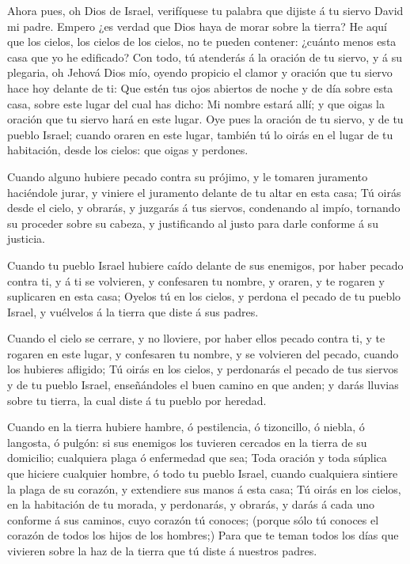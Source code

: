  Ahora pues, oh Dios de Israel, verifíquese tu palabra que
dijiste á tu siervo David mi padre.  Empero ¿es verdad que
Dios haya de morar sobre la tierra? He aquí que los cielos, los cielos
de los cielos, no te pueden contener: ¿cuánto menos esta casa que yo he
edificado?  Con todo, tú atenderás á la oración de tu
siervo, y á su plegaria, oh Jehová Dios mío, oyendo propicio el clamor y
oración que tu siervo hace hoy delante de ti:  Que estén
tus ojos abiertos de noche y de día sobre esta casa, sobre este lugar
del cual has dicho: Mi nombre estará allí; y que oigas la oración que tu
siervo hará en este lugar.  Oye pues la oración de tu
siervo, y de tu pueblo Israel; cuando oraren en este lugar, también tú
lo oirás en el lugar de tu habitación, desde los cielos: que oigas y
perdones.

 Cuando alguno hubiere pecado contra su prójimo, y le
tomaren juramento haciéndole jurar, y viniere el juramento delante de tu
altar en esta casa;  Tú oirás desde el cielo, y obrarás, y
juzgarás á tus siervos, condenando al impío, tornando su proceder sobre
su cabeza, y justificando al justo para darle conforme á su justicia.

 Cuando tu pueblo Israel hubiere caído delante de sus
enemigos, por haber pecado contra ti, y á ti se volvieren, y confesaren
tu nombre, y oraren, y te rogaren y suplicaren en esta casa;
 Oyelos tú en los cielos, y perdona el pecado de tu pueblo
Israel, y vuélvelos á la tierra que diste á sus padres.

 Cuando el cielo se cerrare, y no lloviere, por haber ellos
pecado contra ti, y te rogaren en este lugar, y confesaren tu nombre, y
se volvieren del pecado, cuando los hubieres afligido;  Tú
oirás en los cielos, y perdonarás el pecado de tus siervos y de tu
pueblo Israel, enseñándoles el buen camino en que anden; y darás lluvias
sobre tu tierra, la cual diste á tu pueblo por heredad.

 Cuando en la tierra hubiere hambre, ó pestilencia, ó
tizoncillo, ó niebla, ó langosta, ó pulgón: si sus enemigos los tuvieren
cercados en la tierra de su domicilio; cualquiera plaga ó enfermedad que
sea;  Toda oración y toda súplica que hiciere cualquier
hombre, ó todo tu pueblo Israel, cuando cualquiera sintiere la plaga de
su corazón, y extendiere sus manos á esta casa;  Tú oirás
en los cielos, en la habitación de tu morada, y perdonarás, y obrarás, y
darás á cada uno conforme á sus caminos, cuyo corazón tú conoces;
(porque sólo tú conoces el corazón de todos los hijos de los hombres;)
 Para que te teman todos los días que vivieren sobre la haz
de la tierra que tú diste á nuestros padres.

